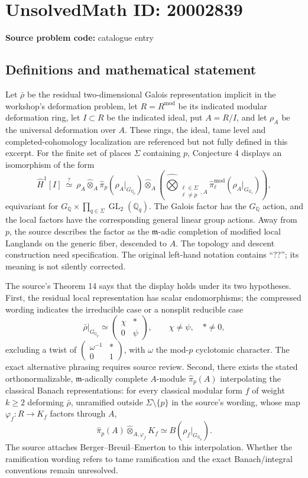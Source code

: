 \documentclass[11pt]{article}
\newcommand{\Q}{\mathbb{Q}}
\begin{document}
\section*{UnsolvedMath ID: 20002839}
\textbf{Source problem code:} catalogue entry
\subsection{Definitions and mathematical statement}
Let $\bar\rho$ be the residual two-dimensional Galois representation implicit in the workshop's deformation problem, let $R=R^{\mathrm{mod}}$ be its indicated modular deformation ring, let $I\subset R$ be the indicated ideal, put $A=R/I$, and let $\rho_A$ be the universal deformation over $A$. These rings, the ideal, tame level and completed-cohomology localization are referenced but not fully defined in this excerpt. For the finite set of places $\Sigma$ containing $p$, Conjecture 4 displays an isomorphism of the form
\[
\widehat H^1[I]\ \stackrel{?}{\simeq}\
\rho_A\widehat\otimes_A
\widehat\pi_p(\rho_A|_{G_{\Q_p}})
\widehat\otimes_A
\left(\widehat\bigotimes_{\substack{\ell\in\Sigma\\\ell\ne p},A}
\widehat\pi^{\mathrm{mod}}_\ell(\rho_A|_{G_{\Q_\ell}})\right),
\]
equivariant for $G_\Q\times\prod_{q\in\Sigma}\operatorname{GL}_2(\Q_q)$. The Galois factor has the $G_\Q$ action, and the local factors have the corresponding general linear group actions. Away from $p$, the source describes the factor as the $\mathfrak m$-adic completion of modified local Langlands on the generic fiber, descended to $A$. The topology and descent construction need specification. The original left-hand notation contains ``??''; its meaning is not silently corrected.

The source's Theorem 14 says that the display holds under its two hypotheses. First, the residual local representation has scalar endomorphisms; the compressed wording indicates the irreducible case or a nonsplit reducible case
\[
\bar\rho|_{G_{\Q_p}}\simeq
\begin{pmatrix}\chi&*\\0&\psi\end{pmatrix},\qquad \chi\ne\psi,\quad *\ne0,
\]
excluding a twist of $\begin{pmatrix}\omega^{-1}&*\\0&1\end{pmatrix}$, with $\omega$ the mod-$p$ cyclotomic character. The exact alternative phrasing requires source review. Second, there exists the stated orthonormalizable, $\mathfrak m$-adically complete $A$-module $\widehat\pi_p(A)$ interpolating the classical Banach representations: for every classical modular form $f$ of weight $k\geq2$ deforming $\bar\rho$, unramified outside $\Sigma\setminus\{p\}$ in the source's wording, whose map $\varphi_f:R\to K_f$ factors through $A$,
\[
\widehat\pi_p(A)\widehat\otimes_{A,\varphi_f}K_f
\simeq B(\rho_f|_{G_{\Q_p}}).
\]
The source attaches Berger--Breuil--Emerton to this interpolation. Whether the ramification wording refers to tame ramification and the exact Banach/integral conventions remain unresolved.
\end{document}
